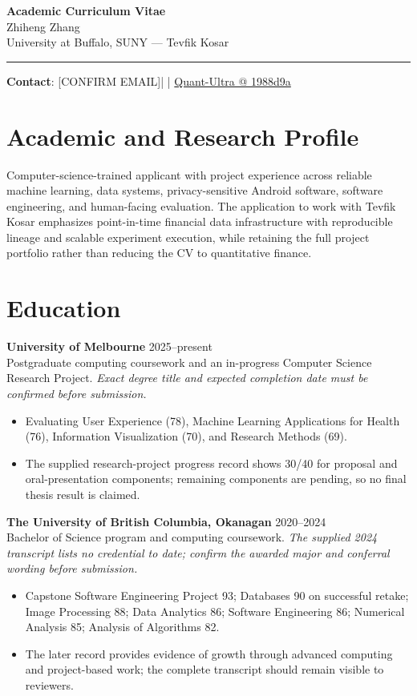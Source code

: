 \documentclass[11pt]{article}
\makeatletter
\newcommand{\ApplicantName}{Zhiheng Zhang}
\newcommand{\ApplicantEmail}{[CONFIRM EMAIL]}
\newcommand{\ApplicantPhone}{[CONFIRM PHONE]}
\newcommand{\ApplicantGitHub}{\href{https://github.com/zhiheng-zhang-Mera/Quant-Ultra/tree/1988d9a8530da91a8158de864d098ea869098923}{Quant-Ultra @ 1988d9a}}
\makeatother
\begin{document}
\begin{center}
{\LARGE\bfseries Academic Curriculum Vitae}\\[0.25em]
{\large \ApplicantName}\\
University at Buffalo, SUNY --- Tevfik Kosar
\end{center}
\vspace{0.35em}\hrule\vspace{0.65em}

\textbf{Contact}: \ApplicantEmail\quad | \quad \ApplicantPhone\quad | \quad \ApplicantGitHub

\section*{Academic and Research Profile}
Computer-science-trained applicant with project experience across reliable machine learning, data systems, privacy-sensitive Android software, software engineering, and human-facing evaluation. The application to work with Tevfik Kosar emphasizes point-in-time financial data infrastructure with reproducible lineage and scalable experiment execution, while retaining the full project portfolio rather than reducing the CV to quantitative finance.

\section*{Education}
\textbf{University of Melbourne} \hfill 2025--present\\
Postgraduate computing coursework and an in-progress Computer Science Research Project. \textit{Exact degree title and expected completion date must be confirmed before submission.}
\begin{itemize}
\item Evaluating User Experience (78), Machine Learning Applications for Health (76), Information Visualization (70), and Research Methods (69).
\item The supplied research-project progress record shows 30/40 for proposal and oral-presentation components; remaining components are pending, so no final thesis result is claimed.
\end{itemize}

\textbf{The University of British Columbia, Okanagan} \hfill 2020--2024\\
Bachelor of Science program and computing coursework. \textit{The supplied 2024 transcript lists no credential to date; confirm the awarded major and conferral wording before submission.}
\begin{itemize}
\item Capstone Software Engineering Project 93; Databases 90 on successful retake; Image Processing 88; Data Analytics 86; Software Engineering 86; Numerical Analysis 85; Analysis of Algorithms 82.
\item The later record provides evidence of growth through advanced computing and project-based work; the complete transcript should remain visible to reviewers.
\end{itemize}
\end{document}
